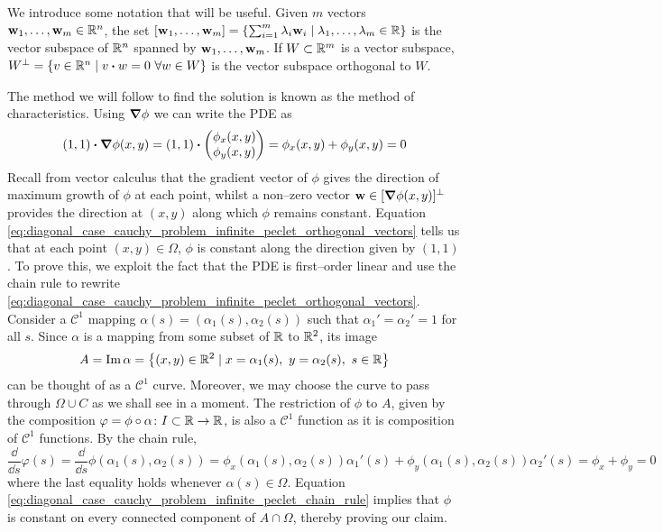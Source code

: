 We introduce some notation that will be useful. Given $m$ vectors $\vb{w}_1,
\ldots, \vb{w}_m \in \mathbb{R}^n$, the set $[\vb{w}_1, \ldots, \vb{w}_m] = \{
\sum_{i=1}^m \lambda_i \vb{w}_i \mid \lambda_1, \ldots, \lambda_m \in \mathbb{R} \}$
is the vector subspace of $\mathbb{R}^n$ spanned by $\vb{w}_1, \ldots, \vb{w}_m$. If
$W \subset \mathbb{R}^m$ is a vector subspace, $W^\perp = \{ v \in \real^n \mid v
\vdot w = 0 \ \forall w \in W \}$ is the vector subspace orthogonal to $W$.

The method we will follow to find the solution is known as the method of
characteristics. Using $\grad{\phi}$ we can write the PDE as
\begin{equation} \label{eq:diagonal_case_cauchy_problem_infinite_peclet_orthogonal_vectors}
	\left( 1, 1 \right)
	\vdot
	\grad{\phi}(x,y) = 
	\left( 1, 1 \right)
	\vdot
	\begin{pmatrix}
		\phi_x(x,y) \\ \phi_y(x,y)
	\end{pmatrix} = 
	\phi_x(x,y) + \phi_y(x,y) = 0
\end{equation}
Recall from vector calculus that the gradient vector of $\phi$ gives the
direction of maximum growth of $\phi$ at each point, whilst a non--zero vector
$\vb{w} \in [\grad{\phi}(x,y)]^\perp$ provides the direction at $(x,y)$ along
which $\phi$ remains constant. Equation
\eqref{eq:diagonal_case_cauchy_problem_infinite_peclet_orthogonal_vectors} tells
us that at each point $(x,y) \in \Omega$, $\phi$ is constant along the direction
given by $(1, 1)$. To prove this, we exploit the fact that the PDE is
first--order linear and use the chain rule to rewrite
\eqref{eq:diagonal_case_cauchy_problem_infinite_peclet_orthogonal_vectors}.
Consider a $\mathcal{C}^1$ mapping $\alpha(s) = (\alpha_1(s), \alpha_2(s))$ such
that $\alpha_1' = \alpha_2' = 1$ for all $s$. Since $\alpha$ is a mapping from
some subset of $\mathbb{R}$ to $\mathbb{R}^2$, its image
\begin{equation}
	A = 
	\image \alpha = 
	\left\{ (x,y) \in \real^2 \mid x = \alpha_1(s), \ y = \alpha_2(s), \ s \in \real \right\}
\end{equation}
can be thought of as a $\mathcal{C}^1$ curve. Moreover, we may choose the curve to
pass through $\Omega \cup C$ as we shall see in a moment. The restriction of $\phi$
to $A$, given by the composition $\varphi = \phi \circ \alpha \colon I \subset
\mathbb{R} \rightarrow \mathbb{R}$, is also a $\mathcal{C}^1$ function as it is
composition of $\mathcal{C}^1$ functions. By the chain rule,
\begin{equation} \label{eq:diagonal_case_cauchy_problem_infinite_peclet_chain_rule}
	\frac{\dd}{\dd{s}} \varphi(s) = 
	\frac{\dd}{\dd{s}} \phi(\alpha_1(s), \alpha_2(s)) = 
	\phi_x (\alpha_1(s), \alpha_2(s)) \alpha_1'(s) +  	
	\phi_y (\alpha_1(s), \alpha_2(s)) \alpha_2'(s) =
	\phi_x + \phi_y = 0
\end{equation}
where the last equality holds whenever $\alpha(s) \in \Omega$. Equation
\eqref{eq:diagonal_case_cauchy_problem_infinite_peclet_chain_rule} implies that
$\phi$ is constant on every connected component of $A \cap
\Omega$, thereby proving our claim. 

